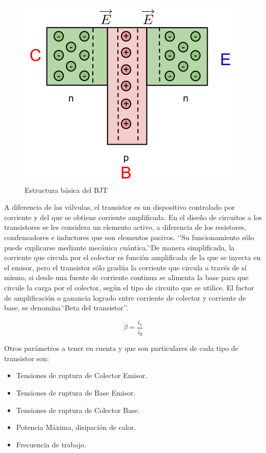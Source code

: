 \documentclass{article}
\begin{document}
\begin{figure}[htbp]
\centering
\includegraphics{images/bjt_base.png}
\caption{Estructura básica del BJT}
\end{figure}

A diferencia de las válvulas, el transistor es un dispositivo controlado
por corriente y del que se obtiene corriente amplificada. En el diseño
de circuitos a los transistores se les considera un elemento activo, a
diferencia de los resistores, condensadores e inductores que son
elementos pasivos. `'Su funcionamiento sólo puede explicarse mediante
mecánica cuántica.'`De manera simplificada, la corriente que circula por
el colector es función amplificada de la que se inyecta en el emisor,
pero el transistor sólo gradúa la corriente que circula a través de sí
mismo, si desde una fuente de corriente continua se alimenta la base
para que circule la carga por el colector, según el tipo de circuito que
se utilice. El factor de amplificación o ganancia logrado entre
corriente de colector y corriente de base, se denomina'`Beta del
transistor''.

\begin{equation}\label{eq:b}
\beta = \frac{i_{c}}{i_{b}}
\end{equation}

Otros parámetros a tener en cuenta y que son particulares de cada tipo
de transistor son:

\begin{itemize}
\itemsep1pt\parskip0pt
\item
  Tensiones de ruptura de Colector Emisor.
\item
  Tensiones de ruptura de Base Emisor.
\item
  Tensiones de ruptura de Colector Base.
\item
  Potencia Máxima, disipación de calor.
\item
  Frecuencia de trabajo.
\end{itemize}
\end{document}
